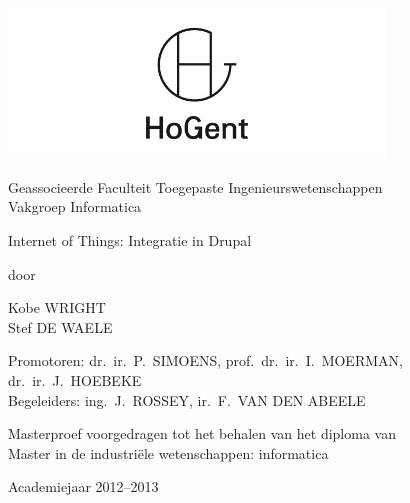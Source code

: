 

\begin{titlepage}

\setlength{\hoffset}{-1in}
\setlength{\voffset}{-1in}
\setlength{\topmargin}{1.5cm}
\setlength{\headheight}{0.5cm}
\setlength{\headsep}{1cm}
\setlength{\oddsidemargin}{3cm}
\setlength{\evensidemargin}{3cm}
\setlength{\footskip}{1.5cm}
\enlargethispage{1cm}

\fontsize{12pt}{14pt}
\selectfont

\begin{center}

\includegraphics[height=4cm]{fig/hogentLogo}

\vspace{0.5cm}

Geassocieerde Faculteit Toegepaste Ingenieurswetenschappen\\
Vakgroep Informatica

\vspace{3.5cm}

\fontsize{17.28pt}{21pt}
\selectfont

Internet of Things: Integratie in Drupal

\fontsize{12pt}{14pt}
\selectfont

\vspace{.6cm}

door 

\vspace{.4cm}

Kobe WRIGHT\\
Stef DE WAELE

\vspace{3.5cm}

Promotoren: dr.~ir.~P.~SIMOENS, prof.~dr.~ir.~I.~MOERMAN, dr.~ir.~J.~HOEBEKE\\
Begeleiders: ing.~J.~ROSSEY, ir.~F.~VAN DEN ABEELE\\

\vspace{2cm}

Masterproef voorgedragen tot het behalen van het diploma van\\
Master in de industri\"{e}le wetenschappen: informatica

\vspace{1cm}

Academiejaar 2012--2013

\end{center}
\end{titlepage}
